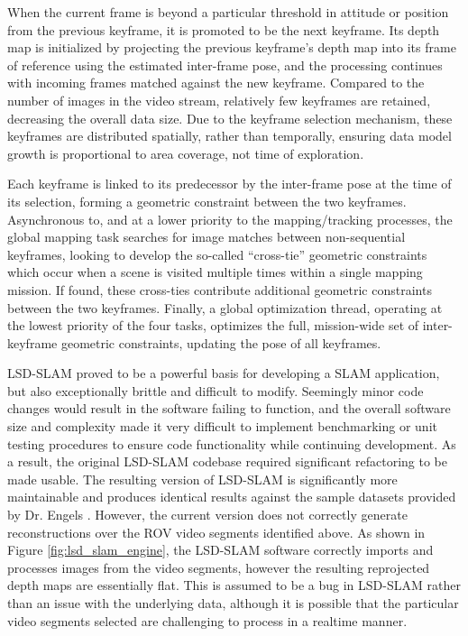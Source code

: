 \documentclass[letterpaper,12pt]{article}
\begin{document}
When the current frame is beyond a particular threshold in attitude or position from the previous keyframe, it is promoted to be the next keyframe.  Its depth map is initialized by projecting the previous keyframe's depth map into its frame of reference using the estimated inter-frame pose, and the processing continues with incoming frames matched against the new keyframe.  Compared to the number of images in the video stream, relatively few keyframes are retained, decreasing the overall data size.   Due to the keyframe selection mechanism, these keyframes are distributed spatially, rather than temporally, ensuring data model growth is proportional to area coverage, not time of exploration. 

Each keyframe is linked to its predecessor by the inter-frame pose at the time of its selection, forming a geometric constraint between the two keyframes.   Asynchronous to, and at a lower priority to the mapping/tracking processes, the global mapping task searches for image matches between non-sequential keyframes, looking to develop the so-called ``cross-tie'' geometric constraints which occur when a scene is visited multiple times within a single mapping mission.   If found, these cross-ties contribute additional geometric constraints between the two keyframes.     Finally, a global optimization thread, operating at the lowest priority of the four tasks, optimizes the full, mission-wide set of inter-keyframe geometric constraints, updating the pose of all keyframes.   

LSD-SLAM proved to be a powerful basis for developing a SLAM application, but also exceptionally brittle and difficult to modify.  Seemingly minor code changes would result in the software failing to function, and the overall software size and complexity made it very difficult to implement benchmarking or unit testing procedures to ensure code functionality while continuing development.   As a result, the original LSD-SLAM codebase required significant refactoring to be made usable.  The resulting version of LSD-SLAM is significantly more maintainable and produces identical results against the sample datasets provided by Dr. Engels \cite{lsdslam}.   However, the current version does not correctly generate reconstructions over the ROV video segments identified above.  As shown in Figure \ref{fig:lsd_slam_engine}, the LSD-SLAM software correctly imports and processes images from the video segments, however the resulting reprojected depth maps are essentially flat.   This is assumed to be a bug in LSD-SLAM rather than an issue with the underlying data, although it is possible that the particular video segments selected are challenging to process in a realtime manner.
\end{document}
